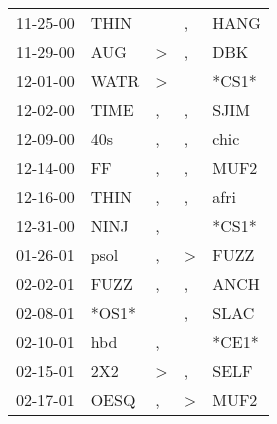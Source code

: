 \begin{supertabular}{p{0.07\textwidth}p{0.06\textwidth}p{0.02\textwidth}p{0.02\textwidth}p{0.06\textwidth}}
          11-25-00\textsuperscript{} &           THIN\textsuperscript{} &                  &                , &           HANG\textsuperscript{} \\
          11-29-00\textsuperscript{} &            AUG\textsuperscript{} &     \textgreater &                , &            DBK\textsuperscript{} \\
          12-01-00\textsuperscript{} &           WATR\textsuperscript{} &     \textgreater &                  &                            *CS1* \\
          12-02-00\textsuperscript{} &           TIME\textsuperscript{} &                , &                , &           SJIM\textsuperscript{} \\
          12-09-00\textsuperscript{} &            40s\textsuperscript{} &                , &                , &           chic\textsuperscript{} \\
          12-14-00\textsuperscript{} &             FF\textsuperscript{} &                , &                , &           MUF2\textsuperscript{} \\
          12-16-00\textsuperscript{} &           THIN\textsuperscript{} &                , &                , &           afri\textsuperscript{} \\
          12-31-00\textsuperscript{} &           NINJ\textsuperscript{} &                , &                  &                            *CS1* \\
          01-26-01\textsuperscript{} &           psol\textsuperscript{} &                , &     \textgreater &           FUZZ\textsuperscript{} \\
          02-02-01\textsuperscript{} &           FUZZ\textsuperscript{} &                , &                , &           ANCH\textsuperscript{} \\
          02-08-01\textsuperscript{} &                            *OS1* &                  &                , &           SLAC\textsuperscript{} \\
          02-10-01\textsuperscript{} &            hbd\textsuperscript{} &                , &                  &                            *CE1* \\
          02-15-01\textsuperscript{} &            2X2\textsuperscript{} &     \textgreater &                , &           SELF\textsuperscript{} \\
          02-17-01\textsuperscript{} &           OESQ\textsuperscript{} &                , &     \textgreater &           MUF2\textsuperscript{} \\

\end{supertabular}
